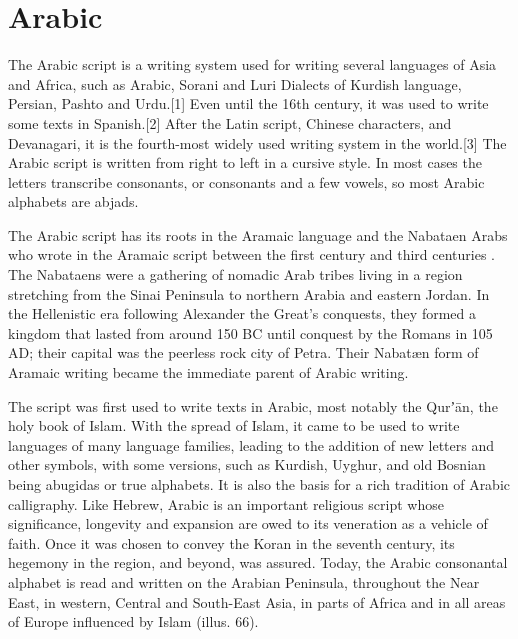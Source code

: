 \section{Arabic}

\newfontfamily{}         %
\newcommand{\textarabic}[1] %
           {\bgroup\luatextextdir TRT\arabian #1\egroup}
\newcommand{\narabic}         [1] %
           {\bgroup\luatextextdir TLT #1\egroup}
\newcommand{\afootnote} [1] %
           {\footnote{\textarabic{#1}}}
\newenvironment{Arabic}     %
           {\luatextextdir TRT\luatexpardir TRT\arabicfont}{}
The Arabic script is a writing system used for writing several languages of Asia and Africa, such as Arabic, Sorani and Luri Dialects of Kurdish language, Persian, Pashto and Urdu.[1] Even until the 16th century, it was used to write some texts in Spanish.[2] After the Latin script, Chinese characters, and Devanagari, it is the fourth-most widely used writing system in the world.[3]
The Arabic script is written from right to left in a cursive style. In most cases the letters transcribe consonants, or consonants and a few vowels, so most Arabic alphabets are abjads.

The Arabic script has its roots in the Aramaic language and the Nabataen Arabs who wrote in the Aramaic script between the first century \BC{} and third centuries \AD{}. The Nabataens were a gathering of nomadic Arab tribes living
in a region stretching from the Sinai Peninsula to northern
Arabia and eastern Jordan. In the Hellenistic era following
Alexander the Great’s conquests, they formed a kingdom that
lasted from around 150 BC until conquest by the Romans in 105
AD; their capital was the peerless rock city of Petra. Their
Nabatæn form of Aramaic writing became the immediate
parent of Arabic writing.   

The script was first used to write texts in Arabic, most notably the Qurʼān, the holy book of Islam. With the spread of Islam, it came to be used to write languages of many language families, leading to the addition of new letters and other symbols, with some versions, such as Kurdish, Uyghur, and old Bosnian being abugidas or true alphabets. It is also the basis for a rich tradition of Arabic calligraphy. Like Hebrew, Arabic is an important religious script whose
significance, longevity and expansion are owed to its veneration as a vehicle of faith. Once it was chosen to convey the Koran in the seventh
century, its hegemony in the region, and beyond, was assured.
Today, the Arabic consonantal alphabet is read and written on
the Arabian Peninsula, throughout the Near East, in western,
Central and South-East Asia, in parts of Africa and in all areas of
Europe influenced by Islam (illus. 66). 

